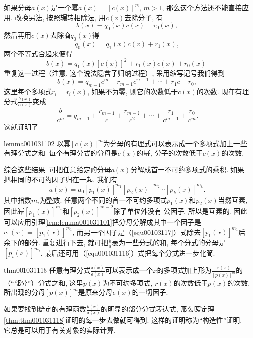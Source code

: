 如果分母$a(x)$是一个幂$a(x)=[c(x)]^m$, $m>1$, 那么这个方法还不能直接应用. 改换另法, 按照辗转相除法, 用$c(x)$去除分子, 有
\[
b(x)=q_0(x)c(x)+r_0(x),
\]
然后再用$c(x)$去除商$q_0(x)$得
\[
q_0(x)=q_1(x)c(x)+r_1(x),
\]
两个不等式合起来便得
\[
b(x) = q_1(x)[c(x)]^2 + r_1(x)c(x)+r_0(x).
\]
重复这一过程（注意, 这个说法隐含了归纳过程）, 采用缩写记号我们得到
\begin{equation}\label{equ001031115}
b(x) = q_{m-1}c^m + r_{m-1}c^{m-1} + \cdots + r_1c + r_0,
\end{equation}
这里每个多项式$r_i = r_i(x)$, 如果不为零, 则它的次数低于$c(x)$的次数. 现在有理分式$\frac{b(x)}{a(x)}$变成
\begin{equation}\label{equ00103116}
\frac{b}{c^m} = q_{m-1} + \frac{r_{m-1}}{c} + \frac{r_{m-2}}{c^2} + \cdots + \frac{r_1}{c^{m-1}} + \frac{r_0}{c^m}.
\end{equation}
这就证明了
\begin{lemma}{}{lemma001031102}
以幂$[c(x)]^m$为分母的有理式可以表示成一个多项式加上一些有理分式之和, 每个有理分式的分母是$c(x)$的幂, 分子的次数低于$c(x)$的次数. 
\end{lemma}

综合这些结果, 可把任意给定的分母$a(x)$分解成首一不可约多项式的乘积. 如果把相同的不可约因子归在一起, 我们有
\begin{equation}\label{equ001031117}
a(x)=a_0[p_1(x)]^{m_1}[p_2(x)]^{m_2}\cdots[p_k(x)]^{m_k}.
\end{equation}
其中指数$m_i$为整数. 任意两个不同的首一不可约多项式$p_1(x)$和$p_2(x)$当然互素, 因此幂$[p_1(x)]^{m_1}$和$[p_2(x)]^{m-2}$除了单位外没有 公因子, 所以是互素的. 因此可以应用引理\ref{lem:lemma001031101}把分母分解成其中一个因子是$c_1(x) = [p_1(x)]^{m_1}$, 而另一个因子是（\ref{equ00103117}）式除去$[p_1(x)]^{m_1}$后余下的部分. 重复进行下去, 就可把$\frac{b}{a}$表为一些分式的和, 每个分式的分母是$[p_i(x)]^{m_i}$. 最后还可用（\ref{equ001031116}）式把每个分式进一步化简. 

\begin{theorem}{}{thm001031118}
任意有理分式$\frac{b(x)}{a(x)}$可以表示成一个$x$的多项式加上形为$\frac{r(x)}{[p(x)]^m}$的（“部分”）分式之和, 这里$p(x)$为不可约多项式, $r(x)$的次数低于$p(x)$的次数. 所出现的分母$[p(x)]^m$是原来分母$a(x)$的一切因子. 
\end{theorem}

如果要找到给定的有理函数$\frac{b(x)}{a(x)}$的明显的部分分式表达式, 那么照定理\ref{thm:thm001031118}证明的每一步去做就可得到. 这样的证明称为“构造性”证明. 它总是可以用于有关对象的实际计算. 

